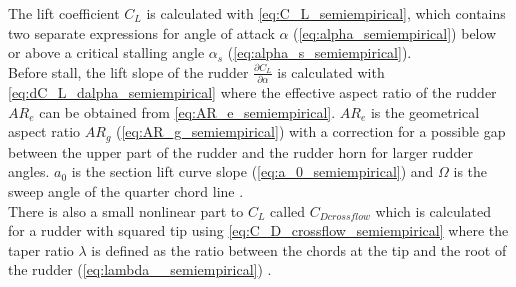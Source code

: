 The lift coefficient $C_L$ is calculated with \autoref{eq:C_L_semiempirical}, which contains two separate expressions for angle of attack $\alpha$ (\autoref{eq:alpha_semiempirical}) below or above a critical stalling angle $\alpha_s$ (\autoref{eq:alpha_s_semiempirical}).
\begin{equation}
    \label{eq:C_L_semiempirical}
    
\end{equation}
%
\begin{equation}
    \label{eq:alpha_s_semiempirical}
    
\end{equation}
%
\begin{equation}
    \label{eq:alpha_semiempirical}
    
\end{equation}
Before stall, the lift slope of the rudder $\frac{\partial C_L}{\partial \alpha}$ is calculated with \autoref{eq:dC_L_dalpha_semiempirical} where the effective aspect ratio of the rudder $AR_e$ can be obtained from \autoref{eq:AR_e_semiempirical}. $AR_e$ is the geometrical aspect ratio $AR_g$ (\autoref{eq:AR_g_semiempirical}) with a correction for a possible gap between the upper part of the rudder and the rudder horn for larger rudder angles.
$a_0$ is the section lift curve slope (\autoref{eq:a_0_semiempirical}) and $\Omega$ is the sweep angle of the quarter chord line \citep{lewis_principles_1989}.
\begin{equation}
    \label{eq:dC_L_dalpha_semiempirical}
    
\end{equation}
%
\begin{equation}
    \label{eq:AR_e_semiempirical}
    
\end{equation}
%
\begin{equation}
    \label{eq:AR_g_semiempirical}
    
\end{equation}
%
\begin{equation}
    \label{eq:a_0_semiempirical}
    
\end{equation}
There is also a small nonlinear part to $C_L$ called $C_{Dcrossflow}$ which is calculated for a rudder with squared tip using \autoref{eq:C_D_crossflow_semiempirical} where the taper ratio $\lambda$ is defined as the ratio between the chords at the tip and the root of the rudder (\autoref{eq:lambda__semiempirical}) \citep{hughes_tempest_2011}. 
\begin{equation}
    \label{eq:C_D_crossflow_semiempirical}
    
\end{equation}
%
\begin{equation}
    \label{eq:lambda__semiempirical}
    
\end{equation}

